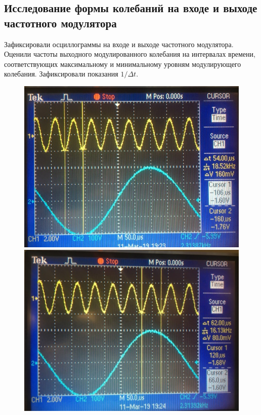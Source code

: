 \subsection{Исследование формы колебаний на входе и выходе частотного модулятора}
Зафиксировали осциллограммы на входе и выходе частотного модулятора. Оценили частоты выходного модулированного колебания на интервалах времени, соответствующих максимальному и минимальному уровням модулирующего колебания. Зафиксировали показания $1 / \Delta t$.
\begin{figure}[H]
	\centering
	\begin{minipage}{0.49\linewidth}
	\includegraphics[width=\linewidth]{photo/task4(1).jpg}
	\end{minipage}
	\begin{minipage}{0.49\linewidth}
	\includegraphics[width=\linewidth]{photo/task4(2).jpg}
	\end{minipage}
	\caption{}
	\label{fig:figure2}
\end{figure}
